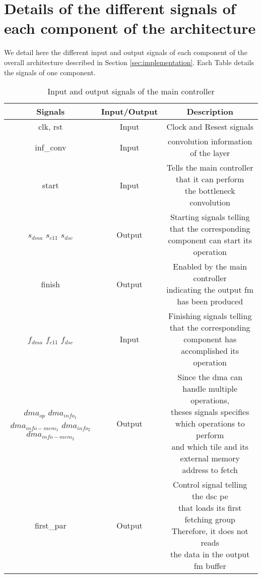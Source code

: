 \chapter{Details of the different signals of each component of the architecture} \label{appendix:sig}
We detail here the different input and output signals of each component of the overall architecture described in Section \ref{sec:implementation}. Each Table details the signals of one component.

\begin{table}[H]
    \begin{tabular}{c|c|c}
        Signals & Input/Output & Description \\
        \hline \hline
        clk, rst & Input & Clock and Resest signals \\
        \hline
        inf\_conv & Input & convolution information of the layer\\
        \hline
        start & Input & \makecell{Tells the main controller that it can perform \\ the bottleneck convolution} \\
        \hline
        \makecell{$s_{dma}$ \\$s_{c11}$\\$s_{dsc}$} & Output & \makecell{Starting signals telling that the corresponding \\ component can start its operation}\\
        \hline
        finish & Output & \makecell{Enabled by the main controller \\ indicating the output \acrshort{fm} has been produced}\\
        \hline
        \makecell{$f_{dma}$ \\$f_{c11}$\\$f_{dsc}$} & Input & \makecell{Finishing signals telling that the corresponding \\ component has accomplished its operation}\\
        \hline
        \makecell{$dma_{op}$\\$dma_{info_1}$\\$dma_{info-mem_1}$\\$dma_{info_2}$\\$dma_{info-mem_2}$} & Output & \makecell{Since the \acrshort{dma} can handle multiple operations,\\ theses signals specifies which operations to perform \\ and which tile and its external memory address to fetch}\\
        \hline
        first\_par & Output & \makecell{Control signal telling the \acrshort{dsc} \acrshort{pe} \\ that loads its first fetching group \\ Therefore, it does not reads \\ the data in the output \acrshort{fm} buffer} \\
        \hline \hline
    \end{tabular}
    \caption{Input and output signals of the main controller}
    \label{tab:mc_sig}
\end{table}
